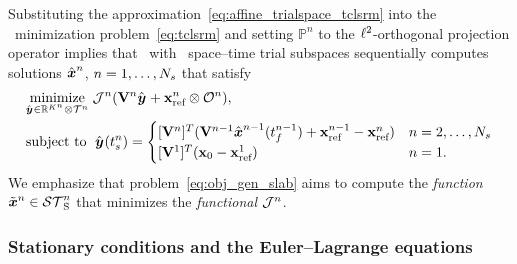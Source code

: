 Substituting the approximation~\eqref{eq:affine_trialspace_tclsrm} into the
\methodAcronym\ minimization problem~\eqref{eq:tclsrm} and setting 
$\mathbb{P}^n$ to the 
$\ell^2$-orthogonal projection operator 
implies that 
\methodAcronym\ with \spatialAcronym\ space--time trial subspaces
sequentially computes solutions
$\hat{ \boldsymbol x}^{n}$, $n = 1,\ldots,N_s$ that satisfy
\begin{equation}\label{eq:obj_gen_slab}
\begin{split}
	& \underset{\genstateyArgnt{} \in \RR{\romdimArg{n}} \otimes \timeSpaceArg{n}
			}{\text{minimize}}\; \mathcal{J}^n(\basismatArg{n} \genstateyArgnt{} +
			\stateInterceptArg{n} \otimes \onesFunction^n), \\ 
      & \text{subject to }\; \genstateyArg{}{\timeStartArg{n}} =
	\begin{cases}
\spatialIC & n = 2,\ldots,\nslabs \\
\genstateICOne & n=1. \end{cases} 
\end{split}
\end{equation}
We emphasize that problem~\eqref{eq:obj_gen_slab} aims to compute the
\textit{function} $\tilde{\boldsymbol x}^{n}\in\mathcal{ ST }_{\text{S}}^{n}$ that minimizes the \textit{functional}
	$\mathcal{J}^{n}$. 	%

\subsubsection{Stationary conditions and the Euler--Lagrange equations}

